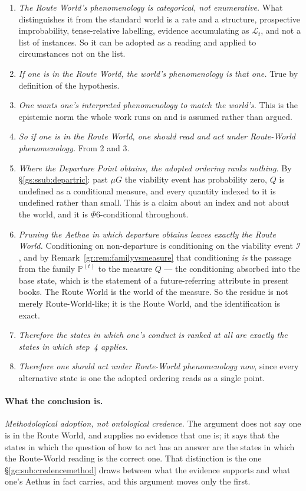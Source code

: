 \documentclass[11pt]{article}
\numberwithin{equation}{section}
\theoremstyle{plain}
\theoremstyle{definition}
\theoremstyle{remark}
\newcommand{\PP}{\mathbb{P}}
\newcommand{\Imm}{\mathcal{I}}
\newcommand{\Lc}{\mathcal{L}}
\begin{document}
\begin{enumerate}\setlength\itemsep{2pt}
\item \emph{The Route World's phenomenology is categorical, not
enumerative.} What distinguishes it from the standard world is a rate
and a structure, prospective improbability, tense-relative labelling,
evidence accumulating as $\Lc_t$, and not a list of instances. So it
can be adopted as a reading and applied to circumstances not on the
list.
\item \emph{If one is in the Route World, the world's phenomenology is
that one.} True by definition of the hypothesis.
\item \emph{One wants one's interpreted phenomenology to match the
world's.} This is the epistemic norm the whole work runs on and is
assumed rather than argued.
\item \emph{So if one is in the Route World, one should read and act
under Route-World phenomenology.} From 2 and 3.
\item \emph{Where the Departure Point obtains, the adopted ordering
ranks nothing.} By \S\ref{gs:ssub:departric}: past $\mu G$ the viability
event has probability zero, $Q$ is undefined as a conditional measure,
and every quantity indexed to it is undefined rather than small. This is
a claim about an index and not about the world, and it is
$\Phi6$-conditional throughout.
\item \emph{Pruning the Aethae in which departure obtains leaves exactly
the Route World.} Conditioning on non-departure is conditioning on the
viability event $\Imm$, and by
Remark~\ref{gr:rem:familyvsmeasure} that conditioning \emph{is} the
passage from the family $\PP^{(t)}$ to the measure $Q$ --- the
conditioning absorbed into the base state, which is the statement of a
future-referring attribute in present books. The Route World is the
world of the measure. So the residue is not merely Route-World-like; it
is the Route World, and the identification is exact.
\item \emph{Therefore the states in which one's conduct is ranked at all
are exactly the states in which step~4 applies.}
\item \emph{Therefore one should act under Route-World phenomenology
now}, since every alternative state is one the adopted ordering reads as
a single point.
\end{enumerate}

\paragraph{What the conclusion is.} \emph{Methodological adoption, not
ontological credence.} The argument does not say one is in the Route
World, and supplies no evidence that one is; it says that the states in
which the question of how to act has an answer are the states in which
the Route-World reading is the correct one. That distinction is the one
\S\ref{gc:sub:credencemethod} draws between what the evidence supports
and what one's Aethus in fact carries, and this argument moves only the
first.
\end{document}

